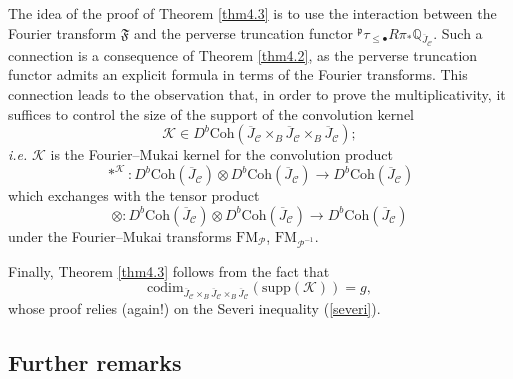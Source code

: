 \documentclass{pspum-l}
\theoremstyle{plain}
\theoremstyle{definition}
\theoremstyle{remark}
\newcommand{\BQ}{{\mathbb{Q}}}
\newcommand{\CC}{{\mathcal C}}
\newcommand{\CK}{{\mathcal K}}
\newcommand{\CP}{{\mathcal P}}
\begin{document}
The idea of the proof of Theorem \ref{thm4.3} is to use the interaction between the Fourier transform $\mathfrak{F}$ and the perverse truncation functor ${^\mathfrak{p}}\tau_{\leq \bullet} R\pi_* \BQ_{\overline{J}_\CC}$. Such a connection is a consequence of Theorem \ref{thm4.2}, as the perverse truncation functor admits an explicit formula in terms of the Fourier transforms. This connection leads to the observation that, in order to prove the multiplicativity, it suffices to control the size of the support of the convolution kernel 
\[
\CK \in D^b\mathrm{Coh}\left( \overline{J}_\CC \times_B \overline{J}_\CC \times_B \overline{J}_\CC \right);
\]
\emph{i.e.} $\CK$ is the Fourier--Mukai kernel for the convolution product
\[
\ast^\CK: D^b\mathrm{Coh}(\overline{J}_\CC) \otimes D^b\mathrm{Coh}(\overline{J}_\CC) \to   D^b\mathrm{Coh}(\overline{J}_\CC)
\]
which exchanges with the tensor product
\[
\otimes: D^b\mathrm{Coh}(\overline{J}_\CC) \otimes D^b\mathrm{Coh}(\overline{J}_\CC) \to   D^b\mathrm{Coh}(\overline{J}_\CC)
\]
under the Fourier--Mukai transforms $\mathrm{FM}_\CP$, $\mathrm{FM}_{\CP^{-1}}$.

Finally, Theorem \ref{thm4.3} follows from the fact that
\[
\mathrm{codim}_{\overline{J}_\CC\times_B \overline{J}_\CC \times_B \overline{J}_\CC}\left(\mathrm{supp}(\CK) \right) =g,
\]
whose proof relies (again!) on the Severi inequality (\ref{severi}).






\subsection{Further remarks}
\end{document}
